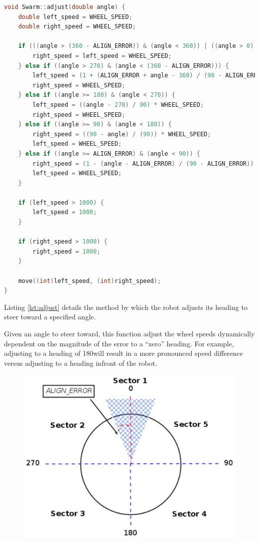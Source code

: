 \begin{lstlisting}[language=C++, caption={Adjust heading},label={lst:adjust}]
void Swarm::adjust(double angle) {
	double left_speed = WHEEL_SPEED;
	double right_speed = WHEEL_SPEED;

	if (((angle > (360 - ALIGN_ERROR)) & (angle < 360)) | ((angle > 0) & (angle < ALIGN_ERROR))) {
		right_speed = left_speed = WHEEL_SPEED;
	} else if ((angle > 270) & (angle < (360 - ALIGN_ERROR))) {
		left_speed = (1 + (ALIGN_ERROR + angle - 360) / (90 - ALIGN_ERROR)) * WHEEL_SPEED;
		right_speed = WHEEL_SPEED;
	} else if ((angle >= 180) & (angle < 270)) {
		left_speed = ((angle - 270) / 90) * WHEEL_SPEED;
		right_speed = WHEEL_SPEED;
	} else if ((angle >= 90) & (angle < 180)) {
		right_speed = ((90 - angle) / (90)) * WHEEL_SPEED;
		left_speed = WHEEL_SPEED;
	} else if ((angle >= ALIGN_ERROR) & (angle < 90)) {
		right_speed = (1 - (angle - ALIGN_ERROR) / (90 - ALIGN_ERROR)) * WHEEL_SPEED;
		left_speed = WHEEL_SPEED;
	}

	if (left_speed > 1000) {
		left_speed = 1000;
	}

	if (right_speed > 1000) {
		right_speed = 1000;
	}

	move((int)left_speed, (int)right_speed);
}
\end{lstlisting}

Listing \ref{lst:adjust} details the method by which the robot adjusts its heading to steer toward a specified angle.

Given an angle to steer toward, this function adjust the wheel speeds dynamically dependent on the magnitude of the error to a ``zero'' heading. For example, adjusting to a heading of 180\textdegree will result in a more pronounced speed difference versus adjusting to a heading infront of the robot.

\begin{figure}[h]
	\centering
	\begin{minipage}{.75\textwidth}
		\centering
		\includegraphics[width=1\linewidth]{sections_robot}
		\label{fig:robot-sectors}
	\end{minipage}
\end{figure}

